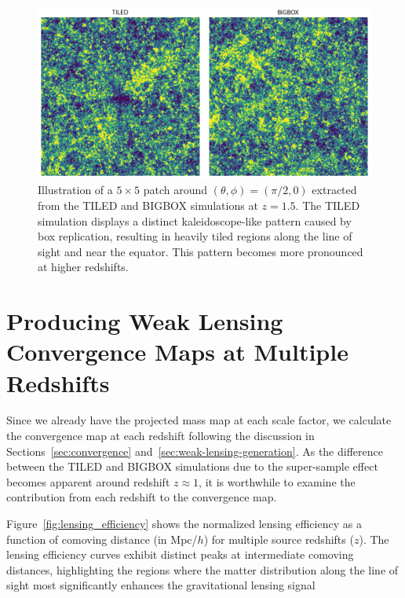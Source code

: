 \begin{figure}[ht]
    \centering
    \includegraphics[width=\textwidth]{figures/samplepatch.png}
    \caption[Illustration of a $5 \times 5$ patch at $z = 1.5$]{Illustration of a $5 \times 5$ patch around $(\theta, \phi) = (\pi/2, 0)$ extracted from the TILED and BIGBOX simulations at $z = 1.5$. The TILED simulation displays a distinct kaleidoscope-like pattern caused by box replication, resulting in heavily tiled regions along the line of sight and near the equator. This pattern becomes more pronounced at higher redshifts.}
    \label{fig:boxreplication_patch}
\end{figure}

\section{Producing Weak Lensing Convergence Maps at Multiple Redshifts}
Since we already have the projected mass map at each scale factor, we calculate the convergence map at each redshift following the discussion in Sections~\ref{sec:convergence} and~\ref{sec:weak-lensing-generation}. As the difference between the TILED and BIGBOX simulations due to the super-sample effect becomes apparent around redshift $z \approx 1$, it is worthwhile to examine the contribution from each redshift to the convergence map.

Figure~\ref{fig:lensing_efficiency} shows the normalized lensing efficiency as a function of comoving distance (in Mpc/$h$) for multiple source redshifts ($z$). The lensing efficiency curves exhibit distinct peaks at intermediate comoving distances, highlighting the regions where the matter distribution along the line of sight most significantly enhances the gravitational lensing signal


